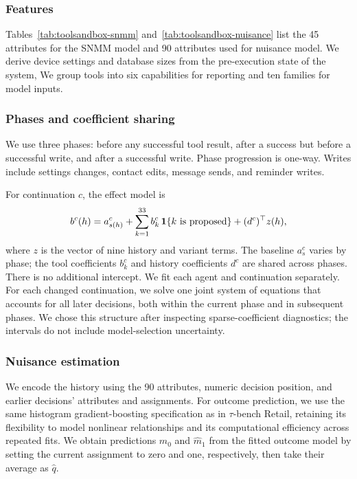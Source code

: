 \subsubsection{Features}
Tables~\ref{tab:toolsandbox-snmm} and~\ref{tab:toolsandbox-nuisance} list the 45
attributes for the SNMM model and 90 attributes used for  nuisance model. We derive device settings and
database sizes from the pre-execution state of the system, We group tools into six capabilities for reporting and ten families for model inputs.



\subsubsection{Phases and coefficient sharing}\label{app:phases-tool}
We use three phases: before any successful tool result, after a success but
before a successful write, and after a successful write. Phase progression is
one-way. Writes include settings changes, contact edits, message sends, and
reminder writes.

For continuation $c$, the effect model is
\[
 b^c(h)=a^c_{s(h)}+\sum_{k=1}^{33}b_k^c\,\mathbf{1}\{k\text{ is proposed}\}
                 +(d^c)^\top z(h),
\]
where $z$ is the vector of nine history and variant terms. The baseline $a_s^c$
varies by phase; the tool coefficients $b_k^c$ and history coefficients $d^c$
are shared across phases. There is no additional intercept. We fit each agent
and continuation separately. For each changed continuation, we solve one joint
system of equations that accounts for all later decisions, both within the
current phase and in subsequent phases. We chose this structure after
inspecting sparse-coefficient diagnostics; the intervals do not include
model-selection uncertainty.

\subsubsection{Nuisance estimation}
We encode the history using the 90  attributes, numeric decision
position, and earlier decisions' attributes and assignments.  For outcome prediction, we use the same histogram
gradient-boosting specification as in $\tau$-bench Retail, retaining its
flexibility to model nonlinear relationships and its computational
efficiency across repeated fits. We obtain predictions $\widehat m_0$
and $\widehat m_1$ from the fitted outcome model by setting the current
assignment to zero and one, respectively, then take their average as
$\widehat q$.

